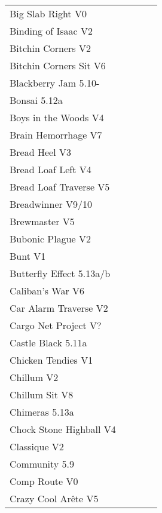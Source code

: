 \begin{flushleft}
\begin{center}
\begin{supertabular}{p{0.76\linewidth}p{0.08\linewidth}}
Big Slab Right V0 & \pageref{rt:Big Slab Right} \\
Binding of Isaac V2 & \pageref{rt:Binding of Isaac} \\
Bitchin Corners V2 & \pageref{rt:Bitchin Corners} \\
Bitchin Corners Sit V6 & \pageref{vr:Bitchin Corners Sit} \\
Blackberry Jam 5.10- & \pageref{rt:Blackberry Jam} \\
Bonsai 5.12a & \pageref{rt:Bonsai} \\
Boys in the Woods V4 & \pageref{rt:Boys in the Woods} \\
Brain Hemorrhage V7 & \pageref{vr:Brain Hemorrhage} \\
Bread Heel V3 & \pageref{rt:Bread Heel} \\
Bread Loaf Left V4 & \pageref{rt:Bread Loaf Left} \\
Bread Loaf Traverse V5 & \pageref{rt:Bread Loaf Traverse} \\
Breadwinner V9/10 & \pageref{rt:Breadwinner} \\
Brewmaster V5 & \pageref{rt:Brewmaster} \\
Bubonic Plague V2 & \pageref{rt:Bubonic Plague} \\
Bunt V1 & \pageref{rt:Bunt} \\
Butterfly Effect 5.13a/b & \pageref{rt:Butterfly Effect} \\
Caliban's War V6 & \pageref{rt:Caliban's War} \\
Car Alarm Traverse V2 & \pageref{rt:Car Alarm Traverse} \\
Cargo Net Project V? & \pageref{rt:Cargo Net Project} \\
Castle Black 5.11a & \pageref{rt:Castle Black} \\
Chicken Tendies V1 & \pageref{rt:Chicken Tendies} \\
Chillum V2 & \pageref{rt:Chillum} \\
Chillum Sit V8 & \pageref{vr:Chillum Sit} \\
Chimeras 5.13a & \pageref{rt:Chimeras} \\
Chock Stone Highball V4 & \pageref{rt:Chock Stone Highball} \\
Classique V2 & \pageref{rt:Classique} \\
Community 5.9 & \pageref{rt:Community} \\
Comp Route V0 & \pageref{rt:Comp Route} \\
Crazy Cool Arête V5 & \pageref{rt:Crazy Cool Arête} \\

\end{supertabular}
\end{center}
\end{flushleft}
